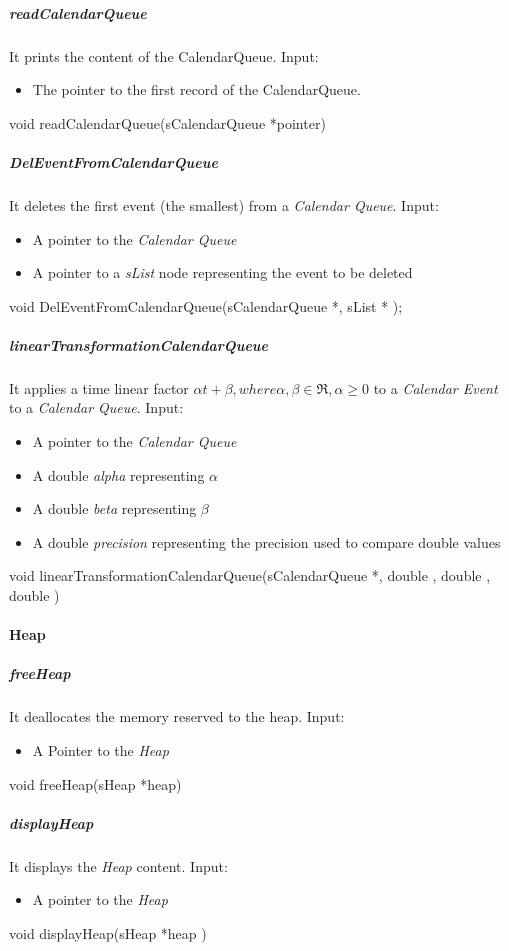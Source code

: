 \subparagraph{readCalendarQueue}

It prints the content of the CalendarQueue.
Input:
\begin{itemize}
\item The pointer to the first record of the CalendarQueue.
\end{itemize}
void readCalendarQueue(sCalendarQueue *pointer)

\subparagraph{DelEventFromCalendarQueue}

It deletes the first event (the smallest) from a \textit{Calendar Queue}. 
Input:
\begin{itemize}
\item A pointer to the \textit{Calendar Queue} 
\item A pointer to a \textit{sList} node representing the event to be deleted
\end{itemize}
void DelEventFromCalendarQueue(sCalendarQueue *, sList * );

\subparagraph{linearTransformationCalendarQueue}

It applies a time linear factor \(\alpha t + \beta , where \alpha, \beta \in \Re, \alpha \geq 0\) to a \textit{Calendar Event} to a \textit{Calendar Queue}. 
Input:
\begin{itemize}
\item A pointer to the \textit{Calendar Queue} 
\item A double \textit{alpha} representing \(\alpha\)
\item A double \textit{beta} representing \(\beta\)
\item A double \textit{precision} representing the precision used to compare double values
\end{itemize}
void linearTransformationCalendarQueue(sCalendarQueue *, double , double , double )

\paragraph{Heap}

\subparagraph{freeHeap}

It deallocates the memory reserved to the heap.
Input:
\begin{itemize}
\item A Pointer to the \textit{Heap}
\end{itemize}
void freeHeap(sHeap *heap)


\subparagraph{displayHeap}
It displays the \textit{Heap} content.
Input:
\begin{itemize}
\item A pointer to the \textit{Heap}
\end{itemize}
void displayHeap(sHeap *heap )



